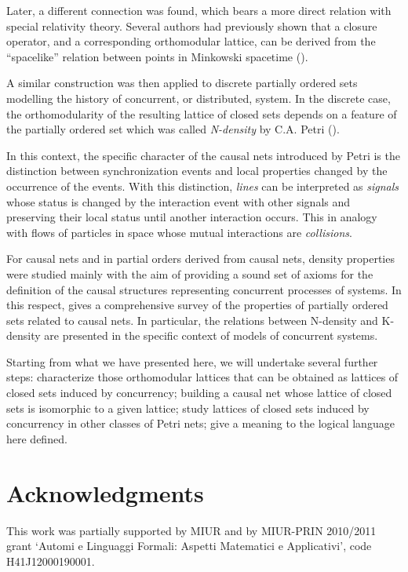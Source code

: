\documentclass{eptcs}
\begin{document}
Later, a different connection was found, which bears a more
direct relation with special relativity theory.
Several authors had previously shown that a closure operator, and a
corresponding orthomodular lattice, can be derived from 
the ``spacelike'' relation between points in Minkowski spacetime
(\cite{C02,CJ77}).

A similar construction was then applied to discrete partially
ordered sets modelling the history of concurrent, or
distributed, system. In the discrete case, the orthomodularity
of the resulting lattice of closed sets depends on a feature
of the partially ordered set which was called
\emph{N-density} by C.A. Petri (\cite{BPR10}).

In this context, the specific character of the causal nets
introduced by Petri is the distinction between synchronization events
and local properties changed by the occurrence of the events. With
this distinction, \emph{lines} can be interpreted as \emph{signals}
whose status is changed by the interaction event with other signals
and preserving their local status until another interaction
occurs. This in analogy with flows of particles in space whose mutual
interactions are \emph{collisions}.

For causal nets and in partial orders derived from causal nets,
density properties were studied mainly with the aim of providing
a sound set of axioms for the definition of the causal structures
representing concurrent processes of systems.
In this respect, \cite{BF88} gives a
comprehensive survey of the properties of partially ordered sets
related to causal nets. In particular, the relations between
N-density and K-density
are presented in the specific context of models of concurrent systems.

Starting from what we have presented here, we will undertake
several further steps: characterize those orthomodular lattices that can
be obtained as lattices of closed sets induced by concurrency;
building a causal net whose lattice of closed sets is
isomorphic to a given lattice; study lattices of closed sets
induced by concurrency in other classes of Petri nets;
give a meaning to the logical language here defined.
\section*{Acknowledgments}
This work was partially supported by MIUR and by
MIUR-PRIN 2010/2011 grant `Automi e Linguaggi Formali:
Aspetti Matematici e Applicativi', code H41J12000190001.


\end{document}
